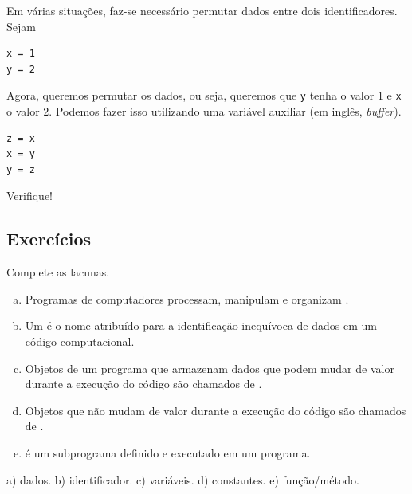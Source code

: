 \begin{ex}\label{cap_lingua_sec_dados:ex:trocaVar}
Em várias situações, faz-se necessário permutar dados entre dois identificadores. Sejam

\begin{lstlisting}
x = 1
y = 2
\end{lstlisting}

Agora, queremos permutar os dados, ou seja, queremos que \texttt{y} tenha o valor $1$ e \texttt{x} o valor $2$. Podemos fazer isso utilizando uma variável auxiliar (em inglês, \textit{buffer}).

\begin{lstlisting}
z = x
x = y
y = z
\end{lstlisting}

Verifique!
\end{ex}

\subsection{Exercícios}

\begin{exer}
  Complete as lacunas.
  \begin{enumerate}[a)]
    \item Programas de computadores processam, manipulam e organizam \underline{\phantom{dados}}.
    \item Um \underline{\phantom{identificador}} é o nome atribuído para a identificação inequívoca de dados em um código computacional.
    \item Objetos de um programa que armazenam dados que podem mudar de valor durante a execução do código são chamados de \underline{\phantom{variáveis}}.
    \item Objetos que não mudam de valor durante a execução do código são chamados de \underline{\phantom{constantes}}.
    \item \underline{\phantom{Função/método}} é um subprograma definido e executado em um programa.
  \end{enumerate}
\end{exer}
\begin{resp}
  a) dados. b) identificador. c) variáveis. d) constantes. e) função/método.
\end{resp}

